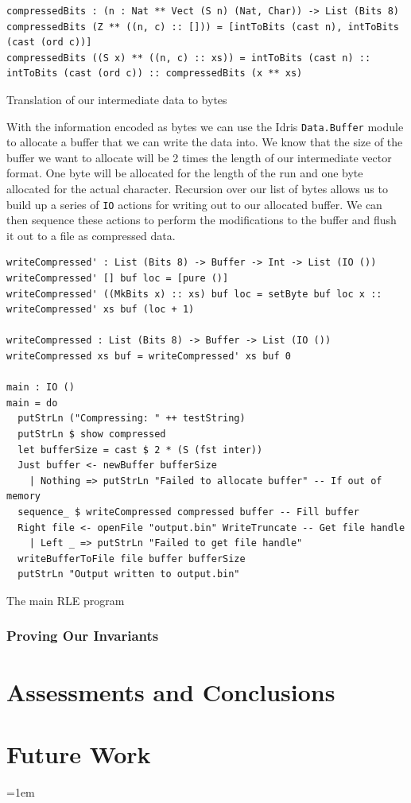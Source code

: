 \documentclass[a4paper, notitlepage]{report}
\begin{document}
\begin{listing}[H]
\begin{verbatim}
compressedBits : (n : Nat ** Vect (S n) (Nat, Char)) -> List (Bits 8)
compressedBits (Z ** ((n, c) :: [])) = [intToBits (cast n), intToBits (cast (ord c))]
compressedBits ((S x) ** ((n, c) :: xs)) = intToBits (cast n) :: intToBits (cast (ord c)) :: compressedBits (x ** xs)
\end{verbatim}
\caption{Translation of our intermediate data to bytes}
\end{listing}

With the information encoded as bytes we can use the Idris \texttt{Data.Buffer} module to
allocate a buffer that we can write the data into. We know that the size of the
buffer we want to allocate will be 2 times the length of our intermediate vector
format. One byte will be allocated for the length of the run and one byte
allocated for the actual character. Recursion over our list of bytes allows us
to build up a series of \texttt{IO} actions for writing out to our allocated buffer. We
can then sequence these actions to perform the modifications to the buffer and
flush it out to a file as compressed data.

\begin{listing}[H]
\begin{verbatim}
writeCompressed' : List (Bits 8) -> Buffer -> Int -> List (IO ())
writeCompressed' [] buf loc = [pure ()]
writeCompressed' ((MkBits x) :: xs) buf loc = setByte buf loc x :: writeCompressed' xs buf (loc + 1)

writeCompressed : List (Bits 8) -> Buffer -> List (IO ())
writeCompressed xs buf = writeCompressed' xs buf 0

main : IO ()
main = do
  putStrLn ("Compressing: " ++ testString)
  putStrLn $ show compressed
  let bufferSize = cast $ 2 * (S (fst inter))
  Just buffer <- newBuffer bufferSize
    | Nothing => putStrLn "Failed to allocate buffer" -- If out of memory
  sequence_ $ writeCompressed compressed buffer -- Fill buffer
  Right file <- openFile "output.bin" WriteTruncate -- Get file handle
    | Left _ => putStrLn "Failed to get file handle"
  writeBufferToFile file buffer bufferSize
  putStrLn "Output written to output.bin"
\end{verbatim}
\caption{The main RLE program}
\end{listing}

\subsection{Proving Our Invariants}
\label{sec:org7229e5b}
\chapter{Assessments and Conclusions}
\label{sec:orga161e83}
\chapter{Future Work}
\label{sec:orgd53dfd4}

\emergencystretch=1em
\printbibliography[heading=bibintoc, title=References]
\appendix
\end{document}
